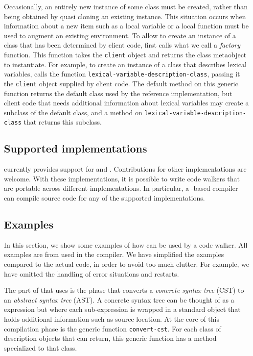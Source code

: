 Occasionally, an entirely new instance of some class must be created,
rather than being obtained by quasi cloning an existing instance.
This situation occurs when information about a new item such as a
local variable or a local function must be used to augment an existing
environment.  To allow \trucler{} to create an instance of a class
that has been determined by client code, \trucler{} first calls what
we call a \emph{factory} function.  This function takes the
\texttt{client} object and returns the class metaobject to
instantiate.  For example, to create an instance of a class that
describes lexical variables, \trucler calls the function
\texttt{lexical-variable-description-class}, passing it the
\texttt{client} object supplied by client code.  The default method on
this generic function returns the default class used by the reference
implementation, but client code that needs additional information
about lexical variables may create a subclass of the default class,
and a method on \texttt{lexical-variable-description-class} that
returns this subclass.

\subsection{Supported \commonlisp{} implementations}
\label{trucler-supported-implementations}

\trucler{} currently provides support for \sbcl{} and \ccl{}.
Contributions for other \commonlisp{} implementations are welcome.
With these implementations, it is possible to write code walkers that
are portable across different \commonlisp{} implementations.  In
particular, a \cleavir{}-based compiler can compile source code for
any of the supported implementations.

\subsection{Examples}

In this section, we show some examples of how \trucler{} can be used
by a code walker.  All examples are from \cleavir{} used in the
\sicl{} compiler.  We have simplified the examples compared to the
actual code, in order to avoid too much clutter.  For example, we have
omitted the handling of error situations and restarts.

The part of \cleavir{} that uses \trucler{} is the phase that converts
a \emph{concrete syntax tree} (CST) to an \emph{abstract syntax tree}
(AST).  A concrete syntax tree can be thought of as a \commonlisp{}
expression but where each sub-expression is wrapped in a standard
object that holds additional information such as source location.  At
the core of this compilation phase is the generic function
\texttt{convert-cst}.  For each class of description objects that
\trucler{} can return, this generic function has a method specialized
to that class.

